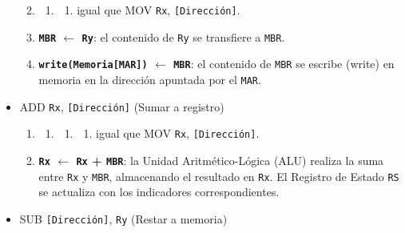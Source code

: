 \documentclass[12pt,oneside]{templates/unerthesis}
\providecommand{\tightlist}{%
  \setlength{\itemsep}{0pt}\setlength{\parskip}{0pt}}
\begin{document}
\begin{itemize}
  \begin{enumerate}
  \def\labelenumi{\arabic{enumi}.}
  \item
    \begin{enumerate}
    \def\labelenumii{\arabic{enumii}.}
    \setcounter{enumii}{1}
    \item
      \begin{enumerate}
      \def\labelenumiii{\arabic{enumiii}.}
      \setcounter{enumiii}{2}
      \tightlist
      \item
        igual que MOV \texttt{Rx}, \texttt{{[}Dirección{]}}.
      \end{enumerate}
    \end{enumerate}
  \item
    \textbf{\texttt{MBR} \(\leftarrow\) \texttt{Ry}}:
    el contenido de \texttt{Ry} se transfiere a \texttt{MBR}.
  \item
    \textbf{\texttt{write(Memoria{[}MAR{]})} \(\leftarrow\) \texttt{MBR}}:
    el contenido de \texttt{MBR} se escribe (write) en memoria en la dirección apuntada por el \texttt{MAR}.
  \end{enumerate}
\item
  ADD \texttt{Rx}, \texttt{{[}Dirección{]}} (Sumar a registro)

  \begin{enumerate}
  \def\labelenumi{\arabic{enumi}.}
  \item
    \begin{enumerate}
    \def\labelenumii{\arabic{enumii}.}
    \setcounter{enumii}{1}
    \item
      \begin{enumerate}
      \def\labelenumiii{\arabic{enumiii}.}
      \setcounter{enumiii}{2}
      \item
        \begin{enumerate}
        \def\labelenumiv{\arabic{enumiv}.}
        \setcounter{enumiv}{3}
        \tightlist
        \item
          igual que MOV \texttt{Rx}, \texttt{{[}Dirección{]}}.
        \end{enumerate}
      \end{enumerate}
    \end{enumerate}
  \item
    \textbf{\texttt{Rx} \(\leftarrow\) \texttt{Rx} + \texttt{MBR}}:
    la Unidad Aritmético-Lógica (ALU) realiza la suma entre \texttt{Rx} y \texttt{MBR}, almacenando el resultado en \texttt{Rx}. El Registro de Estado \texttt{RS} se actualiza con los indicadores correspondientes.
  \end{enumerate}
\item
  SUB \texttt{{[}Dirección{]}}, \texttt{Ry} (Restar a memoria)


\end{itemize}
\end{document}
